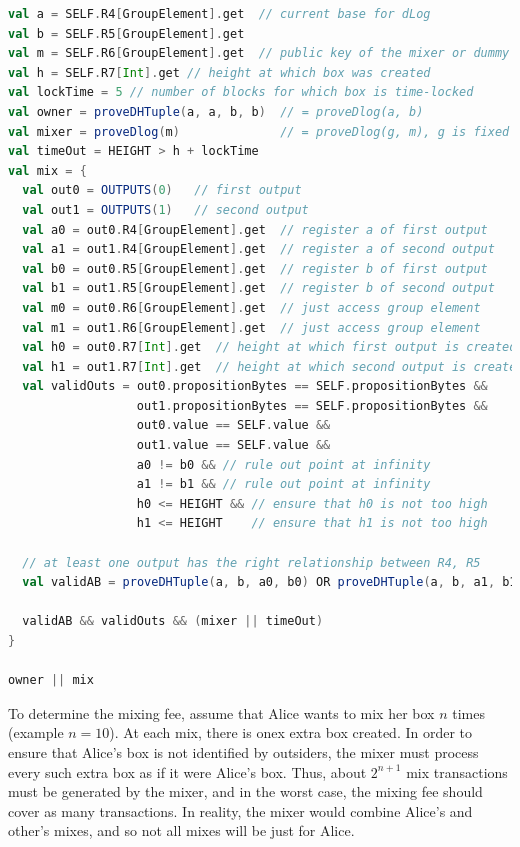 \documentclass[runningheads]{llncs}
\begin{document}
\begin{lstlisting}[language=Scala,caption={Mix-script with Outsourceability},label=mixScript]
val a = SELF.R4[GroupElement].get  // current base for dLog
val b = SELF.R5[GroupElement].get
val m = SELF.R6[GroupElement].get  // public key of the mixer or dummy value
val h = SELF.R7[Int].get // height at which box was created
val lockTime = 5 // number of blocks for which box is time-locked
val owner = proveDHTuple(a, a, b, b)  // = proveDlog(a, b)
val mixer = proveDlog(m)              // = proveDlog(g, m), g is fixed
val timeOut = HEIGHT > h + lockTime
val mix = {
  val out0 = OUTPUTS(0)   // first output
  val out1 = OUTPUTS(1)   // second output
  val a0 = out0.R4[GroupElement].get  // register a of first output
  val a1 = out1.R4[GroupElement].get  // register a of second output
  val b0 = out0.R5[GroupElement].get  // register b of first output
  val b1 = out1.R5[GroupElement].get  // register b of second output
  val m0 = out0.R6[GroupElement].get  // just access group element 
  val m1 = out1.R6[GroupElement].get  // just access group element 
  val h0 = out0.R7[Int].get  // height at which first output is created 
  val h1 = out1.R7[Int].get  // height at which second output is created  
  val validOuts = out0.propositionBytes == SELF.propositionBytes &&
                  out1.propositionBytes == SELF.propositionBytes &&
                  out0.value == SELF.value && 
                  out1.value == SELF.value &&
                  a0 != b0 && // rule out point at infinity
                  a1 != b1 && // rule out point at infinity        
                  h0 <= HEIGHT && // ensure that h0 is not too high
                  h1 <= HEIGHT    // ensure that h1 is not too high
      
  // at least one output has the right relationship between R4, R5
  val validAB = proveDHTuple(a, b, a0, b0) OR proveDHTuple(a, b, a1, b1)

  validAB && validOuts && (mixer || timeOut)
}

owner || mix
\end{lstlisting}

To determine the mixing fee, assume that Alice wants to mix her box $n$ times (example $n = 10$). At each mix, there is onex extra box created. In order to ensure that Alice's box is not identified by outsiders, the mixer must process every such extra box as if it were Alice's box. Thus, about $2^{n+1}$ mix transactions must be generated by the mixer, and in the worst case, the mixing fee should cover as many transactions. In reality, the mixer would combine Alice's and other's mixes, and so not all mixes will be just for Alice. 
\end{document}
